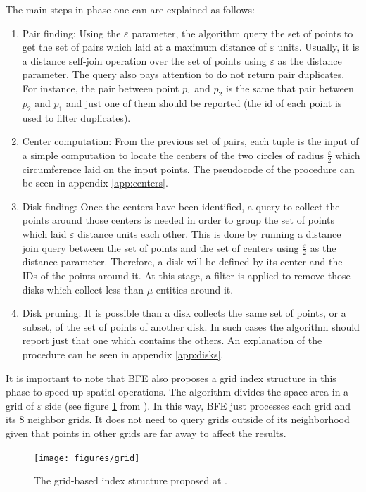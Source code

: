 The main steps in phase one can are explained as follows:
\begin{enumerate}
    \item Pair finding:  Using the $\varepsilon$ parameter, the algorithm query the set of points to get the set of pairs which laid at a maximum distance of $\varepsilon$ units.  Usually, it is a distance self-join operation over the set of points using $\varepsilon$ as the distance parameter.  The query also pays attention to do not return pair duplicates.  For instance, the pair between point $p_1$ and $p_2$ is the same that pair between $p_2$ and $p_1$ and just one of them should be reported (the id of each point is used to filter duplicates).
    \item Center computation:  From the previous set of pairs, each tuple is the input of a simple computation to locate the centers of the two circles of radius $\frac{\varepsilon}{2}$ which circumference laid on the input points.  The pseudocode of the procedure can be seen in appendix \ref{app:centers}.
    \item Disk finding: Once the centers have been identified, a query to collect the points around those centers is needed in order to group the set of points which laid $\varepsilon$ distance units each other.  This is done by running a distance join query between the set of points and the set of centers using $\frac{\varepsilon}{2}$ as the distance parameter. Therefore, a disk will be defined by its center and the IDs of the points around it. At this stage, a filter is applied to remove those disks which collect less than $\mu$ entities around it.
    \item Disk pruning: It is possible than a disk collects the same set of points, or a subset, of the set of points of another disk.  In such cases the algorithm should report just that one which contains the others.  An explanation of the procedure can be seen in appendix \ref{app:disks}.
\end{enumerate}

It is important to note that BFE also proposes a grid index structure in this phase to speed up spatial operations.  The algorithm divides the space area in a grid of $\varepsilon$ side (see figure \ref{fig:grid} from \cite{vieira_2009}).  In this way, BFE just processes each grid and its 8 neighbor grids.  It does not need to query grids outside of its neighborhood given that points in other grids are far away to affect the results.

\begin{figure}
    \centering
    \texttt{[image: figures/grid]}
    \caption{The grid-based index structure proposed at \cite{vieira_2009}.}\label{fig:grid}
\end{figure}

